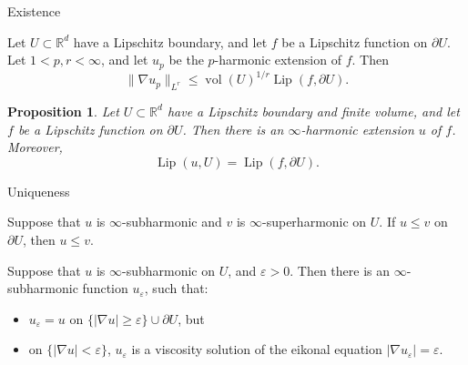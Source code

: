 \documentclass[10pt]{beamer}
\newcommand{\RR}{\mathbb{R}}
\DeclareMathOperator{\Lip}{Lip}
\newtheorem{proposition}{Proposition}
\begin{document}
\begin{frame}{Existence}
\begin{lemma}
Let $U \subset \RR^d$ have a Lipschitz boundary, and let $f$ be a Lipschitz function on $\partial U$.
Let $1 < p, r < \infty$, and let $u_p$ be the $p$-harmonic extension of $f$. Then
$$\|\nabla u_p\|_{L^r} \leq \operatorname{vol}(U)^{1/r} \Lip(f, \partial U) .$$
\end{lemma}
 
\begin{proposition}
Let $U \subset \RR^d$ have a Lipschitz boundary and finite volume, and let $f$ be a Lipschitz function on $\partial U$.
Then there is an $\infty$-harmonic extension $u$ of $f$. Moreover,
$$\Lip(u, U) = \Lip(f, \partial U).$$
\end{proposition}
\end{frame}

\begin{frame}{Uniqueness}
\begin{theorem}
Suppose that $u$ is $\infty$-subharmonic and $v$ is $\infty$-superharmonic on $U$.
If $u \leq v$ on $\partial U$, then $u \leq v$.
\end{theorem}

\begin{lemma}
Suppose that $u$ is $\infty$-subharmonic on $U$, and $\varepsilon > 0$.
Then there is an $\infty$-subharmonic function $u_\varepsilon$, such that: 
\begin{itemize}
\item $u_\varepsilon = u$ on $\{|\nabla u| \geq \varepsilon\} \cup \partial U$, but  
\item on $\{|\nabla u| < \varepsilon\}$, $u_\varepsilon$ is a viscosity solution of the eikonal equation $|\nabla u_\varepsilon| = \varepsilon$.
\end{itemize}
\end{lemma}
\end{frame}
\end{document}
